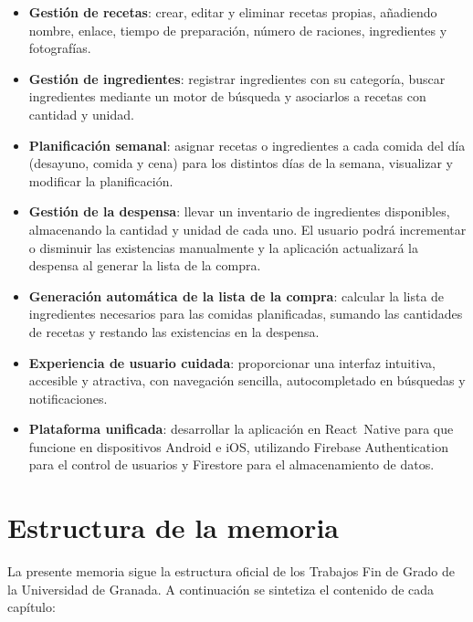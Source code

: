\documentclass[twoside, openright, 11pt]{report}
\begin{document}
\begin{itemize}
  \item \textbf{Gestión de recetas}: crear, editar y eliminar recetas propias, añadiendo nombre, enlace, tiempo de preparación, número de raciones, ingredientes y fotografías.
  \item \textbf{Gestión de ingredientes}: registrar ingredientes con su categoría, buscar ingredientes mediante un motor de búsqueda y asociarlos a recetas con cantidad y unidad.
  \item \textbf{Planificación semanal}: asignar recetas o ingredientes a cada comida del día (desayuno, comida y cena) para los distintos días de la semana, visualizar y modificar la planificación.
  \item \textbf{Gestión de la despensa}: llevar un inventario de ingredientes disponibles, almacenando la cantidad y unidad de cada uno. El usuario podrá incrementar o disminuir las existencias manualmente y la aplicación actualizará la despensa al generar la lista de la compra.
  \item \textbf{Generación automática de la lista de la compra}: calcular la lista de ingredientes necesarios para las comidas planificadas, sumando las cantidades de recetas y restando las existencias en la despensa.
  \item \textbf{Experiencia de usuario cuidada}: proporcionar una interfaz intuitiva, accesible y atractiva, con navegación sencilla, autocompletado en búsquedas y notificaciones.
  \item \textbf{Plataforma unificada}: desarrollar la aplicación en React Native para que funcione en dispositivos Android e iOS, utilizando Firebase Authentication para el control de usuarios y Firestore para el almacenamiento de datos.
\end{itemize}

\section{Estructura de la memoria}
\label{sec.estructura}
La presente memoria sigue la estructura oficial de los Trabajos Fin de Grado de la Universidad de Granada. A continuación se sintetiza el contenido de cada capítulo:
\end{document}
